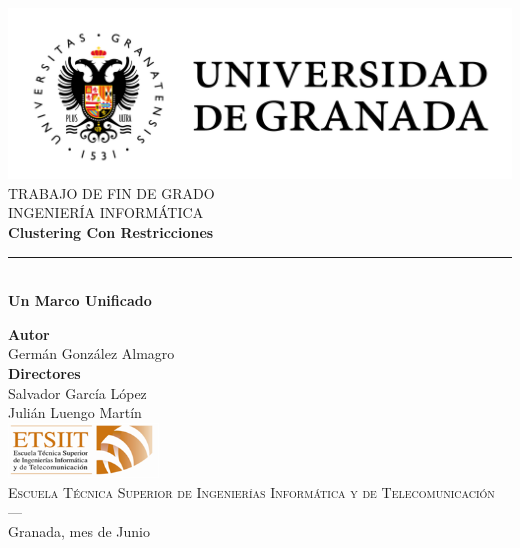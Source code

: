 \begin{titlepage}
 
 
\newlength{\centeroffset}
\setlength{\centeroffset}{-0.5\oddsidemargin}
\addtolength{\centeroffset}{0.5\evensidemargin}
\thispagestyle{empty}

\noindent\hspace*{\centeroffset}\begin{minipage}{\textwidth}

\centering
\includegraphics[width=1\textwidth]{imagenes/COLOR.jpg}\\[1.4cm]

\textsc{ \Large TRABAJO DE FIN DE GRADO\\[0.2cm]}
\textsc{ INGENIERÍA INFORMÁTICA}\\[1cm]
% 
{\Huge\bfseries Clustering Con Restricciones\\
}
\noindent\rule[-1ex]{\textwidth}{3pt}\\[3.5ex]
{\large\bfseries Un Marco Unificado}
\end{minipage}

\vspace{2.5cm}
\noindent\hspace*{\centeroffset}\begin{minipage}{\textwidth}
\centering

\textbf{Autor}\\ {Germán González Almagro}\\[2.5ex]
\textbf{Directores}\\
{Salvador García López\\
Julián Luengo Martín}\\[2cm]
\includegraphics[width=0.3\textwidth]{imagenes/etsiit_logo.png}\\[0.1cm]
\textsc{Escuela Técnica Superior de Ingenierías Informática y de Telecomunicación}\\
\textsc{---}\\
Granada, mes de Junio
\end{minipage}
\end{titlepage}


